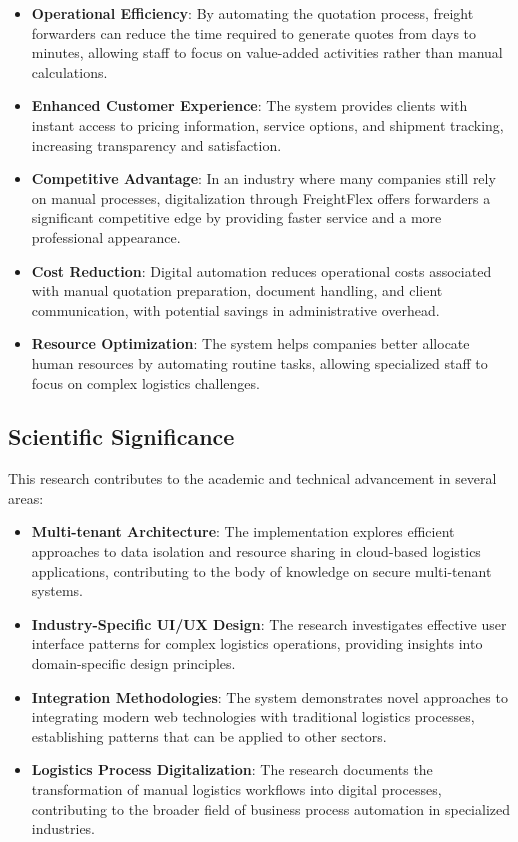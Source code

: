 \begin{itemize}
    \item \textbf{Operational Efficiency}: By automating the quotation process, freight forwarders can reduce the time required to generate quotes from days to minutes, allowing staff to focus on value-added activities rather than manual calculations.
    \item \textbf{Enhanced Customer Experience}: The system provides clients with instant access to pricing information, service options, and shipment tracking, increasing transparency and satisfaction.
    \item \textbf{Competitive Advantage}: In an industry where many companies still rely on manual processes, digitalization through FreightFlex offers forwarders a significant competitive edge by providing faster service and a more professional appearance.
    \item \textbf{Cost Reduction}: Digital automation reduces operational costs associated with manual quotation preparation, document handling, and client communication, with potential savings in administrative overhead.
    \item \textbf{Resource Optimization}: The system helps companies better allocate human resources by automating routine tasks, allowing specialized staff to focus on complex logistics challenges.
\end{itemize}

\subsection{Scientific Significance}

This research contributes to the academic and technical advancement in several areas:

\begin{itemize}
    \item \textbf{Multi-tenant Architecture}: The implementation explores efficient approaches to data isolation and resource sharing in cloud-based logistics applications, contributing to the body of knowledge on secure multi-tenant systems.
    \item \textbf{Industry-Specific UI/UX Design}: The research investigates effective user interface patterns for complex logistics operations, providing insights into domain-specific design principles.
    \item \textbf{Integration Methodologies}: The system demonstrates novel approaches to integrating modern web technologies with traditional logistics processes, establishing patterns that can be applied to other sectors.
    \item \textbf{Logistics Process Digitalization}: The research documents the transformation of manual logistics workflows into digital processes, contributing to the broader field of business process automation in specialized industries.
\end{itemize}

